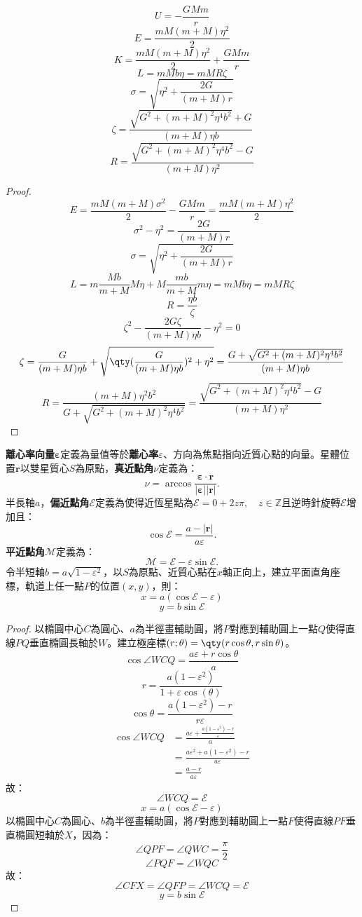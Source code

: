 \documentclass[a4paper,12pt]{article}
\begin{document}
\[U=-\frac{GMm}{r}\]
\[E=\frac{mM(m+M)\eta^2}{2}\]
\[K=\frac{mM(m+M)\eta^2}{2}+\frac{GMm}{r}\]
\[L=mMb\eta=mMR\zeta\]
\[\sigma=\sqrt{\eta^2+\frac{2G}{(m+M)r}}\]
\[\zeta=\frac{\sqrt{G^2+(m+M)^2\eta^4b^2}+G}{(m+M)\eta b}\]
\[R=\frac{\sqrt{G^2+(m+M)^2\eta^4b^2}-G}{(m+M)\eta^2}\]
\begin{proof}
\[E=\frac{mM(m+M)\sigma^2}{2}-\frac{GMm}{r}=\frac{mM(m+M)\eta^2}{2}\]
\[\sigma^2-\eta^2=\frac{2G}{(m+M)r}\]
\[\sigma=\sqrt{\eta^2+\frac{2G}{(m+M)r}}\]
\[L=m\frac{Mb}{m+M}M\eta+M\frac{mb}{m+M}m\eta=mMb\eta=mMR\zeta\]
\[R=\frac{\eta b}{\zeta}\]
\[\zeta^2-\frac{2G\zeta}{(m+M)\eta b}-\eta^2=0\]
\[\zeta=\frac{G}{(m+M)\eta b}+\sqrt{\qty(\frac{G}{(m+M)\eta b})^2+\eta^2}=\frac{G+\sqrt{G^2+(m+M)^2\eta^4b^2}}{(m+M)\eta b}\]
\[R=\frac{(m+M)\eta^2b^2}{G+\sqrt{G^2+(m+M)^2\eta^4b^2}}=\frac{\sqrt{G^2+(m+M)^2\eta^4b^2}-G}{(m+M)\eta^2}\]
\end{proof}
\textbf{離心率向量}$\boldsymbol{\varepsilon}$定義為量值等於\textbf{離心率}$\varepsilon$、方向為焦點指向近質心點的向量。星體位置$\mathbf{r}$以雙星質心$S$為原點，\textbf{真近點角}$\nu$定義為：
\[\nu=\arccos\frac{\boldsymbol{\varepsilon}\cdot\mathbf{r}}{|\boldsymbol{\varepsilon}||\mathbf{r}|}.\]
半長軸$a$，\textbf{偏近點角}$\mathscr{E}$定義為使得近恆星點為$\mathscr{E}=0+2z\pi,\quad z\in\mathbb{Z}$且逆時針旋轉$\mathscr{E}$增加且：
\[\cos\mathscr{E}=\frac{a-|\mathbf{r}|}{a\varepsilon}.\]
\textbf{平近點角}$\mathscr{M}$定義為：
\[\mathscr{M}=\mathscr{E}-\varepsilon\sin\mathscr{E}.\]
令半短軸$b=a\sqrt{1-\varepsilon^2}$，以$S$為原點、近質心點在$x$軸正向上，建立平面直角座標，軌道上任一點$P$的位置$(x,y)$，則：
\[x=a(\cos\mathscr{E}-\varepsilon)\]
\[y=b\sin\mathscr{E}\]
\begin{proof}
以橢圓中心$C$為圓心、$a$為半徑畫輔助圓，將$P$對應到輔助圓上一點$Q$使得直線$PQ$垂直橢圓長軸於$W$。建立極座標$(r;\theta)=\qty(r\cos\theta,r\sin\theta)$。
\[\cos\angle WCQ=\frac{a\varepsilon+r\cos\theta}{a}\]
\[r=\frac{a(1-\varepsilon^2)}{1+\varepsilon\cos(\theta)}\]
\[\cos\theta=\frac{a(1-\varepsilon^2)-r}{r\varepsilon}\]
\[\begin{aligned}
\cos\angle WCQ&=\frac{a\varepsilon+\frac{a(1-\varepsilon^2)-r}{\varepsilon}}{a}\\
&=\frac{a\varepsilon^2+a(1-\varepsilon^2)-r}{a\varepsilon}\\
&=\frac{a-r}{a\varepsilon}
\end{aligned}\]
故：
\[\angle WCQ=\mathscr{E}\]
\[x=a(\cos\mathscr{E}-\varepsilon)\]
以橢圓中心$C$為圓心、$b$為半徑畫輔助圓，將$P$對應到輔助圓上一點$F$使得直線$PF$垂直橢圓短軸於$X$，因為：
\[\angle QPF=\angle QWC=\frac{\pi}{2}\]
\[\angle PQF=\angle WQC\]
故：
\[\angle CFX=\angle QFP=\angle WCQ=\mathscr{E}\]
\[y=b\sin\mathscr{E}\]
\end{proof}
\end{document}
